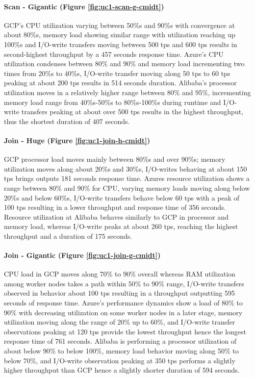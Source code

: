 \documentclass[review]{elsarticle}
\begin{document}
\paragraph{Scan - Gigantic (Figure \ref{fig:uc1-scan-g-cmidt})}GCP's CPU utilization varying between 50\%s and 90\%s with convergence at about 80\%s, memory load showing similar range with utilization reaching up 100\%s and I/O-write transfers moving between 500 tps and 600 tps results in second-highest throughput by a 457 seconds response time. Azure's CPU utilization condenses between 80\% and 90\% and memory load incrementing two times from 20\%s to 40\%s, I/O-write transfer moving along 50 tps to 60 tps peaking at about 200 tps results in 514 seconds duration. Alibaba's processor utilization moves in a relatively higher range between 80\% and 95\%, incrementing memory load range from 40\%s-50\%s to 80\%s-100\%s during runtime and I/O-write transfers peaking at about over 500 tps results in the highest throughput, thus the shortest duration of 407 seconds.

\paragraph{Join - Huge (Figure \ref{fig:uc1-join-h-cmidt})}GCP processor load moves mainly between 80\%s and over 90\%s; memory utilization moves along about 20\%s and 30\%s, I/O-writes behaving at about 150 tps brings outputs 181 seconds response time. Azures resource utilization shows a range between 80\% and 90\% for CPU, varying memory loads moving along below 20\%s and below 60\%s, I/O-write transfers behave below 60 tps with a peak of 100 tps resulting in a lower throughput and response time of 356 seconds. Resource utilization at Alibaba behaves similarly to GCP in processor and memory load, whereas I/O-write peaks at about 260 tps, reaching the highest throughput and a duration of 175 seconds.

\paragraph{Join - Gigantic (Figure \ref{fig:uc1-join-g-cmidt})}CPU load in GCP moves along 70\% to 90\% overall whereas RAM utilization among worker nodes takes a path within 50\% to 90\% range, I/O-write transfers observed in behavior about 100 tps resulting in a throughput outputting 595 seconds of response time. Azure's performance dynamics show a load of 80\% to 90\% with decreasing utilization on some worker nodes in a later stage, memory utilization moving along the range of 20\% up to 60\%, and I/O-write transfer observations peaking at 120 tps provide the lowest throughput hence the longest response time of 761 seconds. Alibaba is performing a processor utilization of about below 90\% to below 100\%, memory load behavior moving along 50\% to below 70\%, and I/O-write observation peaking at 350 tps performs a slightly higher throughput than GCP hence a slightly shorter duration of 594 seconds.
\end{document}
